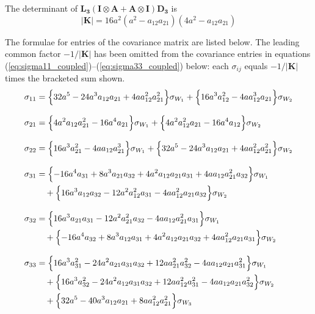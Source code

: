 \documentclass{article}
\begin{document}
The determinant of $\mathbf{L_3}(\mathbf{I} \otimes \mathbf{A} + \mathbf{A} \otimes \mathbf{I}) \mathbf{D_3}$ is
\begin{equation}
|\mathbf{K}| = 16a^{2}\left(a^{2}-a_{12}a_{21}\right)\left(4a^{2}-a_{12}a_{21}\right)
\end{equation}

The formulae for entries of the covariance matrix are listed below.
The leading common factor $-1/|\mathbf{K}|$ has been omitted from the
covariance entries in equations
(\ref{eq:sigma11_coupled})--(\ref{eq:sigma33_coupled}) below: each
$\sigma_{ij}$ equals $-1/|\mathbf{K}|$ times the bracketed sum shown.
\begin{align}
\sigma_{11}&= \Bigl\{ 32a^5-24a^3a_{12}a_{21}+4aa_{12}^2a_{21}^2 \Bigr\} \sigma_{W_{1}}
+ \Bigl\{ 16a^3a_{12}^2-4aa_{12}^3a_{21} \Bigr\} \sigma_{W_{2}} \label{eq:sigma11_coupled} \\[8pt]
\sigma_{21}&= \Bigl\{ 4a^2a_{12}a_{21}^2-16a^4a_{21} \Bigr\} \sigma_{W_{1}}
+ \Bigl\{ 4a^2a_{12}^2a_{21}-16a^4a_{12} \Bigr\} \sigma_{W_{2}} \label{eq:sigma21_coupled} \\[8pt]
\sigma_{22}&= \Bigl\{ 16a^3a_{21}^2-4aa_{12}a_{21}^3 \Bigr\} \sigma_{W_{1}}
+ \Bigl\{ 32a^5-24a^3a_{12}a_{21}+4aa_{12}^2a_{21}^2 \Bigr\} \sigma_{W_{2}} \label{eq:sigma22_coupled} \\[8pt]
\sigma_{31}&= \Bigl\{ -16a^4a_{31}+8a^3a_{21}a_{32}+4a^2a_{12}a_{21}a_{31}+4aa_{12}a_{21}^2a_{32} \Bigr\} \sigma_{W_{1}} \nonumber \\
&\quad + \Bigl\{ 16a^3a_{12}a_{32}-12a^2a_{12}^2a_{31}-4aa_{12}^2a_{21}a_{32} \Bigr\} \sigma_{W_{2}} \label{eq:sigma31_coupled} \\[8pt]
\sigma_{32}&= \Bigl\{ 16a^3a_{21}a_{31}-12a^2a_{21}^2a_{32}-4aa_{12}a_{21}^2a_{31} \Bigr\} \sigma_{W_{1}} \nonumber \\
&\quad + \Bigl\{ -16a^4a_{32}+8a^3a_{12}a_{31}+4a^2a_{12}a_{21}a_{32}+4aa_{12}^2a_{21}a_{31} \Bigr\} \sigma_{W_{2}} \label{eq:sigma32_coupled} \\[8pt]
\sigma_{33}&= \Bigl\{ 16a^3a_{31}^2-24a^2a_{21}a_{31}a_{32}+12aa_{21}^2a_{32}^2-4aa_{12}a_{21}a_{31}^2 \Bigr\} \sigma_{W_{1}} \nonumber \\
&\quad + \Bigl\{ 16a^3a_{32}^2-24a^2a_{12}a_{31}a_{32}+12aa_{12}^2a_{31}^2-4aa_{12}a_{21}a_{32}^2 \Bigr\} \sigma_{W_{2}} \nonumber \\
&\quad + \Bigl\{ 32a^5-40a^3a_{12}a_{21}+8aa_{12}^2a_{21}^2 \Bigr\} \sigma_{W_{3}} \label{eq:sigma33_coupled}
\end{align}
\end{document}

